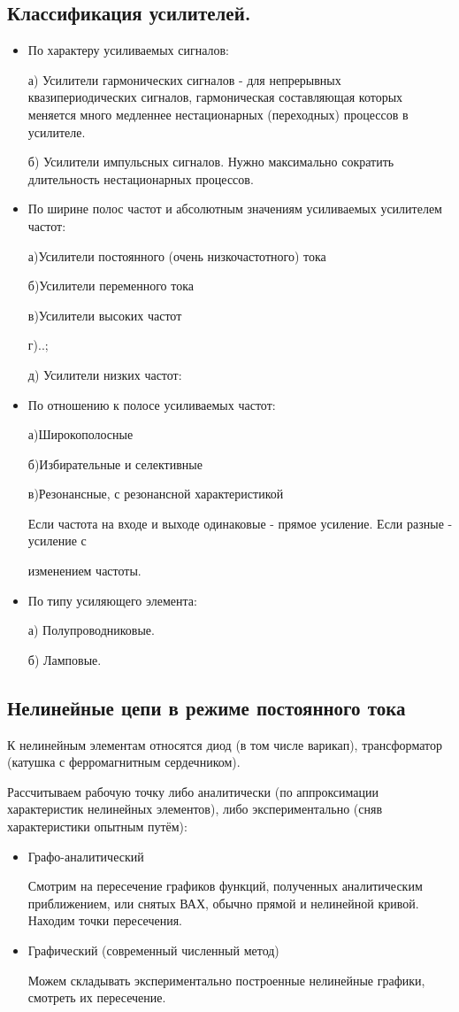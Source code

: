 \documentclass[a4paper,12pt]{report}
\begin{document}
\subsection{Классификация усилителей.}
\begin{itemize}
\item По характеру усиливаемых сигналов:

а) Усилители гармонических сигналов  - для непрерывных квазипериодических сигналов, гармоническая составляющая которых меняется много медленнее нестационарных (переходных) процессов в усилителе.

б) Усилители импульсных сигналов. Нужно максимально сократить длительность нестационарных процессов.

\item По ширине полос частот и абсолютным значениям усиливаемых усилителем частот:

а)Усилители постоянного (очень низкочастотного) тока

б)Усилители переменного тока

в)Усилители высоких частот

г)..;

д) Усилители низких частот:

\item По отношению к полосе усиливаемых частот:

а)Широкополосные

б)Избирательные и селективные

в)Резонансные, с резонансной характеристикой

Если частота на входе и выходе одинаковые - прямое усиление. Если разные - усиление с 

изменением частоты.

\item По типу усиляющего элемента:

а) Полупроводниковые.

б) Ламповые.
\end{itemize}

\subsection{Нелинейные цепи в режиме постоянного тока}
К нелинейным элементам относятся диод (в том числе варикап), трансформатор (катушка с ферромагнитным сердечником).

Рассчитываем рабочую точку либо аналитически (по аппроксимации характеристик нелинейных элементов), либо экспериментально (сняв характеристики опытным путём):
\begin{itemize}
\item Графо-аналитический

Смотрим на пересечение графиков функций, полученных аналитическим приближением, или снятых ВАХ, обычно прямой и нелинейной кривой. Находим точки пересечения.

\item Графический (современный численный метод)

Можем складывать экспериментально построенные нелинейные графики, смотреть их пересечение.
\end{itemize}
\end{document}

